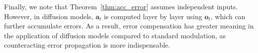 Finally, we note that Theorem~\ref{thm:acc_error} assumes independent inputs. However, in diffusion models, \(\mathbf{a}_t\) is computed layer by layer using \(\mathbf{o}_t\), which can further accumulate errors. As a result, error compensation has greater meaning in the application of diffusion models compared to standard modulation, as counteracting error propagation is more indispensable.  
